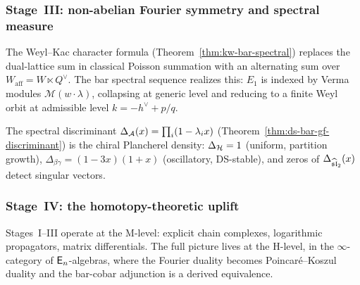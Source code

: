 \subsubsection{Stage~III: non-abelian Fourier symmetry and spectral
  measure}

\begin{remark}
\label{rem:weyl-nonabelian-fourier}
The Weyl--Kac character formula (Theorem~\ref{thm:kw-bar-spectral}) replaces the dual-lattice sum in classical Poisson summation with an alternating sum over $W_{\mathrm{aff}} = W \ltimes Q^\vee$.  The bar spectral sequence realizes this: $E_1$ is indexed by Verma modules $\mathcal{M}(w \cdot \lambda)$, collapsing at generic level and reducing to a finite Weyl orbit at admissible level $k = -h^\vee + p/q$.
\end{remark}

\begin{remark}
\label{rem:spectral-plancherel}
The spectral discriminant $\Delta_{\mathcal{A}}(x) = \prod_i (1 - \lambda_i x)$ (Theorem~\ref{thm:ds-bar-gf-discriminant}) is the chiral Plancherel density: $\Delta_{\mathcal{H}} = 1$ (uniform, partition growth), $\Delta_{\beta\gamma} = (1 - 3x)(1 + x)$ (oscillatory, DS-stable), and zeros of $\Delta_{\widehat{\mathfrak{sl}}_2}(x)$ detect singular vectors.
\end{remark}

\subsubsection{Stage~IV: the homotopy-theoretic uplift}

Stages~I--III operate at the M-level: explicit chain complexes,
logarithmic propagators, matrix differentials.  The full picture
lives at the H-level, in the $\infty$-category of $\mathsf{E}_n$-algebras,
where the Fourier duality becomes Poincar\'e--Koszul duality and the
bar-cobar adjunction is a derived equivalence.

